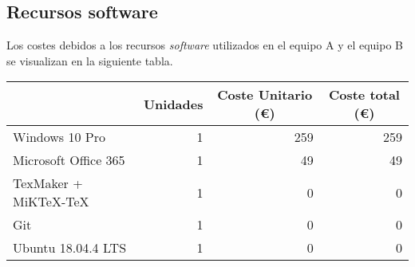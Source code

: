 \subsection{Recursos software}
\label{subsec:recursos-software}

Los costes debidos a los recursos \textit{software} utilizados en el equipo A y el equipo B se visualizan en la siguiente tabla.

\vspace{0.5cm}

\begin{table}[ht]
\centering
\begin{tabular}{lrrr}
\hline
\rowcolor[HTML]{EFEFEF} 
\multicolumn{1}{|c|}{\cellcolor[HTML]{EFEFEF}\textbf{Concepto}} & \multicolumn{1}{c|}{\cellcolor[HTML]{EFEFEF}\textbf{Unidades}} & \multicolumn{1}{c|}{\cellcolor[HTML]{EFEFEF}\textbf{Coste Unitario (\euro)}} & \multicolumn{1}{c|}{\cellcolor[HTML]{EFEFEF}\textbf{Coste total (\euro)}} \\ \hline
\multicolumn{1}{|l|}{Windows 10 Pro}                            & \multicolumn{1}{r|}{1}                                         & \multicolumn{1}{r|}{259}                                               & \multicolumn{1}{r|}{259}                                            \\ \hline
\multicolumn{1}{|l|}{Microsoft Office 365}                      & \multicolumn{1}{r|}{1}                                         & \multicolumn{1}{r|}{49}                                                & \multicolumn{1}{r|}{49}                                             \\ \hline
\multicolumn{1}{|l|}{TexMaker + MiKTeX-TeX}                     & \multicolumn{1}{r|}{1}                                         & \multicolumn{1}{r|}{0}                                                 & \multicolumn{1}{r|}{0}                                              \\ \hline
\multicolumn{1}{|l|}{Git}                                       & \multicolumn{1}{r|}{1}                                         & \multicolumn{1}{r|}{0}                                                 & \multicolumn{1}{r|}{0}                                              \\ \hline
\multicolumn{1}{|l|}{Ubuntu 18.04.4 LTS}                        & \multicolumn{1}{r|}{1}                                         & \multicolumn{1}{r|}{0}                                                 & \multicolumn{1}{r|}{0}                                              \\ \hline

\end{tabular}
\end{table}
